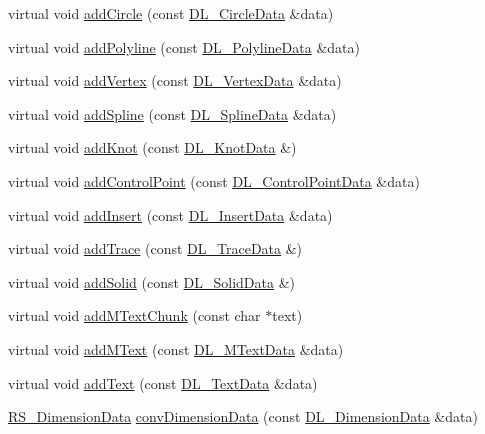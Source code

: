 \begin{DoxyCompactItemize}
\item 
virtual void \hyperlink{classRS__FilterDXF_a67f9544453e79404c568b20038c6e86f}{add\-Circle} (const \hyperlink{structDL__CircleData}{D\-L\-\_\-\-Circle\-Data} \&data)
\item 
virtual void \hyperlink{classRS__FilterDXF_a185c8165ee0b6b7142c062b068f5e28a}{add\-Polyline} (const \hyperlink{structDL__PolylineData}{D\-L\-\_\-\-Polyline\-Data} \&data)
\item 
virtual void \hyperlink{classRS__FilterDXF_ad2bf9ff679bfa0c3a667ae25299ef9ad}{add\-Vertex} (const \hyperlink{structDL__VertexData}{D\-L\-\_\-\-Vertex\-Data} \&data)
\item 
virtual void \hyperlink{classRS__FilterDXF_a41207e3cfd5e59e0be5bb25b477ce108}{add\-Spline} (const \hyperlink{structDL__SplineData}{D\-L\-\_\-\-Spline\-Data} \&data)
\item 
virtual void \hyperlink{classRS__FilterDXF_adf68ce2900c525f14354537bce5cc688}{add\-Knot} (const \hyperlink{structDL__KnotData}{D\-L\-\_\-\-Knot\-Data} \&)
\item 
virtual void \hyperlink{classRS__FilterDXF_a7d741bc81ca6763b64815e4abf43ee84}{add\-Control\-Point} (const \hyperlink{structDL__ControlPointData}{D\-L\-\_\-\-Control\-Point\-Data} \&data)
\item 
virtual void \hyperlink{classRS__FilterDXF_adc983b8fb0d98007b6143a3f3d0fc9e4}{add\-Insert} (const \hyperlink{structDL__InsertData}{D\-L\-\_\-\-Insert\-Data} \&data)
\item 
virtual void \hyperlink{classRS__FilterDXF_af2b3b0293fb68318ef74dbf8040cd57a}{add\-Trace} (const \hyperlink{structDL__TraceData}{D\-L\-\_\-\-Trace\-Data} \&)
\item 
virtual void \hyperlink{classRS__FilterDXF_ab260dabe9013d5f0df9a4ae2f07cd8da}{add\-Solid} (const \hyperlink{structDL__TraceData}{D\-L\-\_\-\-Solid\-Data} \&)
\item 
virtual void \hyperlink{classRS__FilterDXF_a3fa43b97143634ea09ee221c734a1fd2}{add\-M\-Text\-Chunk} (const char $\ast$text)
\item 
virtual void \hyperlink{classRS__FilterDXF_a817fbb2f1610803b0332f26b8f93b1ad}{add\-M\-Text} (const \hyperlink{structDL__MTextData}{D\-L\-\_\-\-M\-Text\-Data} \&data)
\item 
virtual void \hyperlink{classRS__FilterDXF_ae11dc853065daddace03fba9c20212e9}{add\-Text} (const \hyperlink{structDL__TextData}{D\-L\-\_\-\-Text\-Data} \&data)
\item 
\hyperlink{classRS__DimensionData}{R\-S\-\_\-\-Dimension\-Data} \hyperlink{classRS__FilterDXF_a5fec3f68a7a604783265650bf50f42a9}{conv\-Dimension\-Data} (const \hyperlink{structDL__DimensionData}{D\-L\-\_\-\-Dimension\-Data} \&data)

\end{DoxyCompactItemize}

